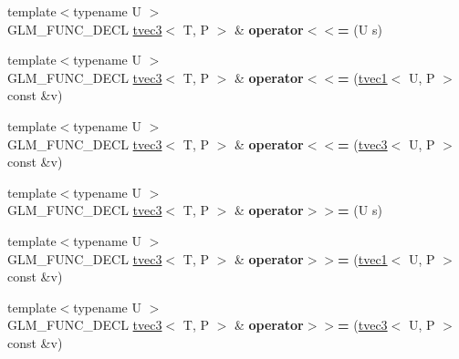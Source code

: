 \begin{DoxyCompactItemize}
\item 
\hypertarget{structglm_1_1tvec3_a483463451fa4b40e936ca5fc6ab1bf37}{{\footnotesize template$<$typename U $>$ }\\G\-L\-M\-\_\-\-F\-U\-N\-C\-\_\-\-D\-E\-C\-L \hyperlink{structglm_1_1tvec3}{tvec3}$<$ T, P $>$ \& {\bfseries operator$<$$<$=} (U s)}\label{structglm_1_1tvec3_a483463451fa4b40e936ca5fc6ab1bf37}

\item 
\hypertarget{structglm_1_1tvec3_af0d715a07138f9619ac7ee1924fa8940}{{\footnotesize template$<$typename U $>$ }\\G\-L\-M\-\_\-\-F\-U\-N\-C\-\_\-\-D\-E\-C\-L \hyperlink{structglm_1_1tvec3}{tvec3}$<$ T, P $>$ \& {\bfseries operator$<$$<$=} (\hyperlink{structglm_1_1tvec1}{tvec1}$<$ U, P $>$ const \&v)}\label{structglm_1_1tvec3_af0d715a07138f9619ac7ee1924fa8940}

\item 
\hypertarget{structglm_1_1tvec3_af05b4498d260dd9d784292b6a7873a80}{{\footnotesize template$<$typename U $>$ }\\G\-L\-M\-\_\-\-F\-U\-N\-C\-\_\-\-D\-E\-C\-L \hyperlink{structglm_1_1tvec3}{tvec3}$<$ T, P $>$ \& {\bfseries operator$<$$<$=} (\hyperlink{structglm_1_1tvec3}{tvec3}$<$ U, P $>$ const \&v)}\label{structglm_1_1tvec3_af05b4498d260dd9d784292b6a7873a80}

\item 
\hypertarget{structglm_1_1tvec3_aa4d5b8971a1fbef3132c1a52717dbf98}{{\footnotesize template$<$typename U $>$ }\\G\-L\-M\-\_\-\-F\-U\-N\-C\-\_\-\-D\-E\-C\-L \hyperlink{structglm_1_1tvec3}{tvec3}$<$ T, P $>$ \& {\bfseries operator$>$$>$=} (U s)}\label{structglm_1_1tvec3_aa4d5b8971a1fbef3132c1a52717dbf98}

\item 
\hypertarget{structglm_1_1tvec3_a7cb73c7e9a6756532e450515bc7f67ec}{{\footnotesize template$<$typename U $>$ }\\G\-L\-M\-\_\-\-F\-U\-N\-C\-\_\-\-D\-E\-C\-L \hyperlink{structglm_1_1tvec3}{tvec3}$<$ T, P $>$ \& {\bfseries operator$>$$>$=} (\hyperlink{structglm_1_1tvec1}{tvec1}$<$ U, P $>$ const \&v)}\label{structglm_1_1tvec3_a7cb73c7e9a6756532e450515bc7f67ec}

\item 
\hypertarget{structglm_1_1tvec3_a42bc834efe85364cd4ec1f3398c433be}{{\footnotesize template$<$typename U $>$ }\\G\-L\-M\-\_\-\-F\-U\-N\-C\-\_\-\-D\-E\-C\-L \hyperlink{structglm_1_1tvec3}{tvec3}$<$ T, P $>$ \& {\bfseries operator$>$$>$=} (\hyperlink{structglm_1_1tvec3}{tvec3}$<$ U, P $>$ const \&v)}\label{structglm_1_1tvec3_a42bc834efe85364cd4ec1f3398c433be}

\end{DoxyCompactItemize}
